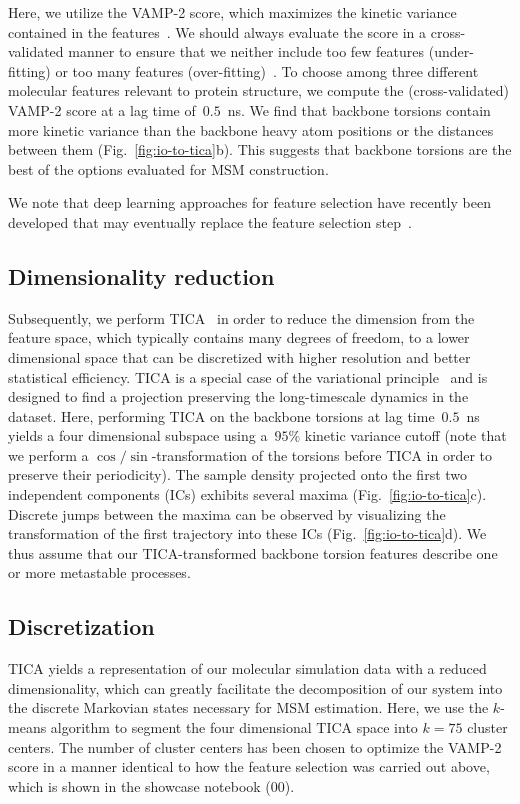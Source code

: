 \documentclass[9pt,tutorial]{livecoms}
\begin{document}
Here, we utilize the VAMP-2 score, which maximizes the kinetic variance contained in the features~\cite{kinetic-maps}.
We should always evaluate the score in a cross-validated manner to ensure that we neither include too few features (under-fitting) or too many features (over-fitting)~\cite{gmrq,vamp-preprint}.
To choose among three different molecular features relevant to protein structure, we compute the (cross-validated) VAMP-2 score at a lag time of~$0.5$~ns.
We find that backbone torsions contain more kinetic variance than the backbone heavy atom positions or the distances between them (Fig.~\ref{fig:io-to-tica}b).
This suggests that backbone torsions are the best of the options evaluated for MSM construction.

We note that deep learning approaches for feature selection have recently been developed that may eventually replace the feature selection step~\cite{vampnet,tae,hernandez-vde}.

\subsection{Dimensionality reduction}

Subsequently, we perform TICA~\cite{tica,kinetic-maps} in order to reduce the dimension from the feature space, which typically contains many degrees of freedom, to a lower dimensional space that can be discretized with higher resolution and better statistical efficiency.
TICA is a special case of the variational principle~\cite{noe-vac,nueske-vamk} and is designed to find a projection preserving the long-timescale dynamics in the dataset.
Here, performing TICA on the backbone torsions at lag time~$0.5$~ns yields a four dimensional subspace using a~$95\%$ kinetic variance cutoff (note that we perform a $\cos/\sin$-transformation of the torsions before TICA in order to preserve their periodicity).
The sample density projected onto the first two independent components (ICs) exhibits several maxima (Fig.~\ref{fig:io-to-tica}c).
Discrete jumps between the maxima can be observed by visualizing the transformation of the first trajectory into these ICs (Fig.~\ref{fig:io-to-tica}d).
We thus assume that our TICA-transformed backbone torsion features describe one or more metastable processes.

\subsection{Discretization}
TICA yields a representation of our molecular simulation data with a reduced dimensionality, which can greatly facilitate the decomposition of our system into the discrete Markovian states necessary for MSM estimation. Here, we use the $k$-means algorithm to segment the four dimensional TICA space into $k=75$ cluster centers. The number of cluster centers has been chosen to optimize the VAMP-2 score in a manner identical to how the feature selection was carried out above, which is shown in the showcase notebook (00).
\end{document}

